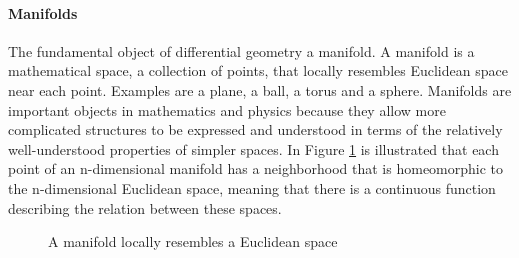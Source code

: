 

\paragraph{Manifolds}
The fundamental object of differential geometry a manifold. A manifold is a mathematical space, a collection of points, that locally resembles Euclidean space near each point. Examples are a plane, a ball, a torus and a sphere. Manifolds are important objects in mathematics and physics because they allow more complicated structures to be expressed and understood in terms of the relatively well-understood properties of simpler spaces. In Figure \ref{fig:mod.manifold} is illustrated that each point of an n-dimensional manifold has a neighborhood that is homeomorphic to the n-dimensional Euclidean space, meaning that there is a continuous function describing the relation between these spaces.

\begin{figure}[h!]
	\centering
	\caption{A manifold locally resembles a Euclidean space\label{fig:mod.manifold}}
\end{figure}


